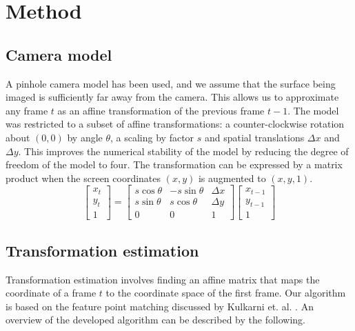 \section{Method}
\subsection{Camera model}

A pinhole camera model has been used, and we assume that the surface being imaged is sufficiently far away from the camera.
This allows us to approximate any frame $t$ as an affine transformation of the previous frame $t-1$.
The model was restricted to a subset of affine transformations:
a counter-clockwise rotation about $(0,0)$ by angle $\theta$,
a scaling by factor $s$ 
and spatial translations $\Delta x$ and $\Delta y$.
This improves the numerical stability of the model by reducing the degree of freedom of the model to four.
The transformation can be expressed by a matrix product when the screen coordinates $(x,y)$ is augmented to $(x,y,1)$.
\begin{equation}
  \begin{bmatrix}
    x_{t}\\
    y_{t}\\
		1
  \end{bmatrix}
  =
  \begin{bmatrix}
		s\cos\theta & -s\sin\theta & \Delta x \\
    s\sin\theta &  s\cos\theta & \Delta y \\
    0           &  0           & 1
  \end{bmatrix}
  \begin{bmatrix}
		x_{t-1} \\
		y_{t-1} \\
		1
  \end{bmatrix}
\end{equation}


\subsection{Transformation estimation}

Transformation estimation involves finding an affine matrix that maps the coordinate of a frame $t$ to the coordinate space of the first frame.
Our algorithm is based on the feature point matching discussed by Kulkarni et. al. \cite{Kulkarni2017}.
An overview of the developed algorithm can be described by the following.

\begin{algorithmic}
	\ENDFOR
	\ENDFOR
\end{algorithmic}

